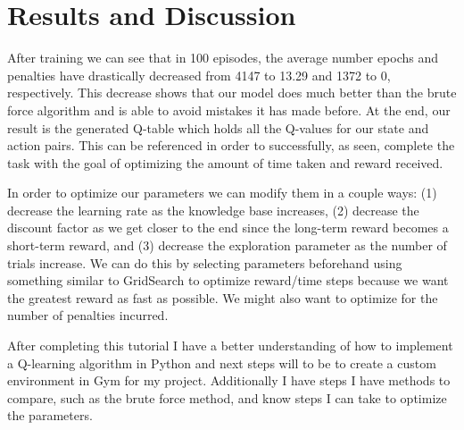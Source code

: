 \documentclass[10pt,twocolumn]{article}
\begin{document}
\section{Results and Discussion}

After training we can see that in 100 episodes, the average number epochs and penalties have drastically decreased from 4147 to 13.29 and 1372 to 0, respectively.
This decrease shows that our model does much better than the brute force algorithm and is able to avoid mistakes it has made before.
At the end, our result is the generated Q-table which holds all the Q-values for our state and action pairs.
This can be referenced in order to successfully, as seen, complete the task with the goal of optimizing the amount of time taken and reward received.

In order to optimize our parameters we can modify them in a couple ways: (1) decrease the learning rate as the knowledge base increases, (2) decrease the discount factor as we get closer to the end since the long-term reward becomes a short-term reward, and (3) decrease the exploration parameter as the number of trials increase. We can do this by selecting parameters beforehand using something similar to GridSearch to optimize reward/time steps because we want the greatest reward as fast as possible. We might also want to optimize for the number of penalties incurred.

After completing this tutorial I have a better understanding of how to implement a Q-learning algorithm in Python and next steps will to be to create a custom environment in Gym for my project.
Additionally I have steps I have methods to compare, such as the brute force method, and know steps I can take to optimize the parameters.

\printbibliography
\end{document}
